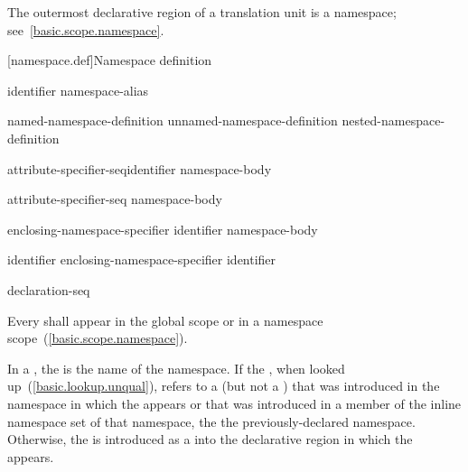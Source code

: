 \pnum
The outermost declarative region of a translation unit is a namespace;
see~\ref{basic.scope.namespace}.

[namespace.def]{Namespace definition}%
%

\begin{bnf}
\br
        identifier\br
        namespace-alias
\end{bnf}

\begin{bnf}
\br
        named-namespace-definition\br
        unnamed-namespace-definition\br
        nested-namespace-definition
\end{bnf}

\begin{bnf}
\br
          attribute-specifier-seq\opt identifier \terminal{\{} namespace-body \terminal{\}}
\end{bnf}

\begin{bnf}
\br
          attribute-specifier-seq\opt{} \terminal{\{} namespace-body \terminal{\}}
\end{bnf}

\begin{bnf}
\br
         enclosing-namespace-specifier \terminal{::} identifier \terminal{\{} namespace-body \terminal{\}}
\end{bnf}

\begin{bnf}
\br
        identifier\br
        enclosing-namespace-specifier \terminal{::} identifier
\end{bnf}

\begin{bnf}
\br
        declaration-seq\opt
\end{bnf}

\pnum
Every  shall appear in the global scope
or in a namespace scope~(\ref{basic.scope.namespace}).

\pnum
In a ,
the  is the name of the namespace.
If the , when looked up~(\ref{basic.lookup.unqual}),
refers to a  (but not a )
that was introduced in the namespace
in which the  appears
or that was introduced in a member of the inline namespace set of that namespace,
the 
 the previously-declared namespace.
Otherwise, the  is introduced
as a  into the declarative region
in which the  appears.

